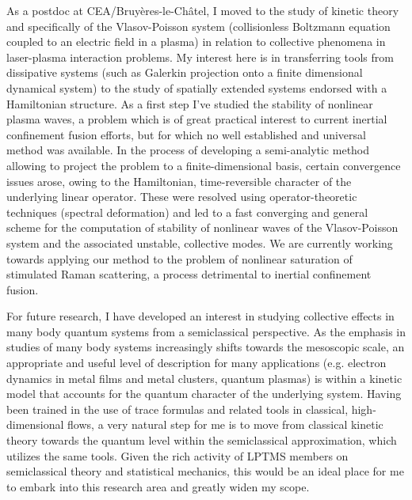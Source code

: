 \documentclass[11pt,a4paper,final]{moderncv}
\begin{document}
As a postdoc at CEA/Bruy\`{e}res-le-Ch\^{a}tel, I moved to the study of kinetic 
theory and specifically of the Vlasov-Poisson system (collisionless Boltzmann 
equation coupled to an electric field in a plasma) in relation to 
collective phenomena in laser-plasma interaction problems. 
My interest here is in transferring tools from dissipative
systems (such as Galerkin projection onto a finite dimensional dynamical system)
to the study of spatially extended systems endorsed with a Hamiltonian
structure. As a first step I've studied the stability of nonlinear plasma waves,
a problem which is of great practical interest to current inertial
confinement fusion efforts, but for which no well established and universal
method was available. In the process of developing a semi-analytic method
allowing to project the problem to a finite-dimensional basis, certain
convergence issues arose, owing to the Hamiltonian, time-reversible character of
the underlying linear operator. These were resolved using operator-theoretic
techniques (spectral deformation) and led to a fast converging and general
scheme for the computation of stability of nonlinear waves of the Vlasov-Poisson
system and the associated unstable, collective modes. We are currently working 
towards applying our method to the problem of nonlinear saturation of stimulated 
Raman scattering, a process detrimental to inertial confinement fusion.

For future research, I have developed an interest in studying collective 
effects in many body quantum systems from a semiclassical 
perspective. As the emphasis in studies of many body systems increasingly shifts 
towards the mesoscopic scale, an appropriate and useful level of description for many 
applications (e.g. electron dynamics in metal films and metal clusters, 
quantum plasmas) is within a kinetic model that accounts for the 
quantum character of the underlying system. 
Having been trained in the use of trace formulas and related
tools in classical, high-dimensional flows, 
a very natural step for me is to move from 
classical kinetic theory towards the quantum level within the semiclassical
 approximation, which utilizes the same tools.
Given the rich activity of LPTMS members on semiclassical theory 
and statistical mechanics, this would be an ideal place for me to embark
into this research area and greatly widen my scope.


\end{document}
